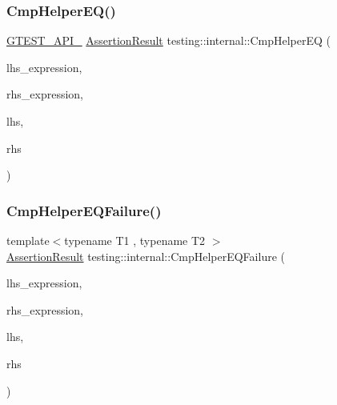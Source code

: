 \mbox{\label{namespacetesting_1_1internal_a1edf90480571c0659a39d13e3777d9ce}} 
\subsubsection{\texorpdfstring{CmpHelperEQ()}{CmpHelperEQ()}\hspace{0.1cm}{\footnotesize\ttfamily [2/2]}}
{\footnotesize\ttfamily \mbox{\hyperlink{gtest-port_8h_aa73be6f0ba4a7456180a94904ce17790}{G\+T\+E\+S\+T\+\_\+\+A\+P\+I\+\_\+}} \mbox{\hyperlink{classtesting_1_1_assertion_result}{Assertion\+Result}} testing\+::internal\+::\+Cmp\+Helper\+EQ (\begin{DoxyParamCaption}\item[{const char $\ast$}]{lhs\+\_\+expression,  }\item[{const char $\ast$}]{rhs\+\_\+expression,  }\item[{\mbox{\hyperlink{namespacetesting_1_1internal_a05c6bd9ede5ccdf25191a590d610dcc6}{Biggest\+Int}}}]{lhs,  }\item[{\mbox{\hyperlink{namespacetesting_1_1internal_a05c6bd9ede5ccdf25191a590d610dcc6}{Biggest\+Int}}}]{rhs }\end{DoxyParamCaption})}

\mbox{\label{namespacetesting_1_1internal_a1def8ec9393360a1b34a20528703e7f7}} 
\subsubsection{\texorpdfstring{CmpHelperEQFailure()}{CmpHelperEQFailure()}}
{\footnotesize\ttfamily template$<$typename T1 , typename T2 $>$ \\
\mbox{\hyperlink{classtesting_1_1_assertion_result}{Assertion\+Result}} testing\+::internal\+::\+Cmp\+Helper\+E\+Q\+Failure (\begin{DoxyParamCaption}\item[{const char $\ast$}]{lhs\+\_\+expression,  }\item[{const char $\ast$}]{rhs\+\_\+expression,  }\item[{const T1 \&}]{lhs,  }\item[{const T2 \&}]{rhs }\end{DoxyParamCaption})}

